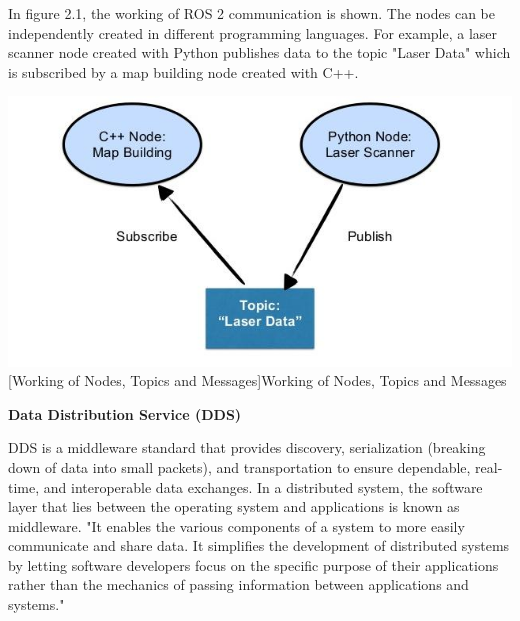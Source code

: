 \documentclass[%
xelatex,
	oneside,		%
	12pt,			%
	parskip=half,	%
	abstracton,
	chapterprefix=true%
    appendixprefix=true]
{scrbook}
\begin{document}
	\vspace*{0.25cm}
In figure 2.1, the working of ROS 2 communication is shown. The nodes can be independently created in different programming languages. For example, a laser scanner node created with Python publishes data to the topic "Laser Data" which is subscribed by a map building node created with C++. 
\begin{center}
\includegraphics[scale=0.7]{fig/node_topic.jpg}
[Working of Nodes, Topics and Messages]{Working of Nodes, Topics and Messages \cite{node_topic}}
\label{fig:node}
\end{center}


\vspace*{0.25cm}

	{\bfseries Data Distribution Service (DDS)}
	
	
	\vspace*{0.5cm}
	DDS is a middleware standard that provides discovery, serialization (breaking down of data into small packets), and transportation to ensure dependable, real-time, and interoperable data exchanges.
	In a distributed system, the software layer that lies between the operating system and applications is known as middleware. "It enables the various components of a system to more easily communicate and share data. It simplifies the development of distributed systems by letting software developers focus on the specific purpose of their applications rather than the mechanics of passing information between applications and systems." \cite{DDS}
\end{document}

